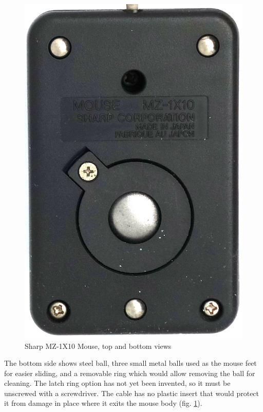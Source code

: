 \documentclass[11pt, a4paper]{article}
\begin{document}
\begin{figure}[h]
    \includegraphics[scale=0.55]{1983_sharp_mz_1x10_mouse/bottom_15.jpg}
    \caption{Sharp MZ-1X10 Mouse, top and bottom views}
    \label{fig:SharpMZ1x10TopAndBottom}
\end{figure}

The bottom side shows steel ball, three small metal balls used as the mouse feet for easier sliding, and a removable ring which would allow removing the ball for cleaning. The latch ring option has not yet been invented, so it must be unscrewed with a screwdriver. The cable has no plastic insert that would protect it from damage in place where it exits the mouse body (fig. \ref{fig:SharpMZ1x10TopAndBottom}).
\end{document}
